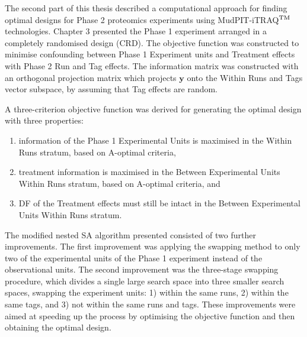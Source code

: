 The second part of this thesis described a computational approach for finding optimal designs for Phase 2 proteomics experiments using MudPIT-iTRAQ$^{\rm TM}$ technologies. Chapter 3 presented the Phase 1 experiment arranged in a completely randomised design (CRD). The objective function was constructed to minimise confounding between Phase 1 Experiment units and Treatment effects with Phase 2 Run and Tag effects. The information matrix was constructed with an orthogonal projection matrix which projects $\bm{y}$ onto the Within Runs and Tags vector subspace, by assuming that Tag effects are random.

A three-criterion objective function was derived for generating the optimal design with three properties: 
\begin{enumerate}
\item information of the Phase 1 Experimental Units is maximised in the Within Runs stratum, based on A-optimal criteria,
\item treatment information is maximised in the Between Experimental Units Within Runs stratum, based on A-optimal criteria, and 
\item DF of the Treatment effects must still be intact in the Between Experimental Units Within Runs stratum.
\end{enumerate}

The modified nested SA algorithm presented consisted of two further improvements. The first improvement was applying the swapping method to only two of the experimental units of the Phase 1 experiment instead of the observational units. The second improvement was the three-stage swapping procedure, which divides a single large search space into three smaller search spaces, swapping the experiment units: 1) within the same runs, 2) within the same tags, and 3) not within the same runs and tags. These improvements were aimed at speeding up the process by optimising the objective function and then obtaining the optimal design. 

